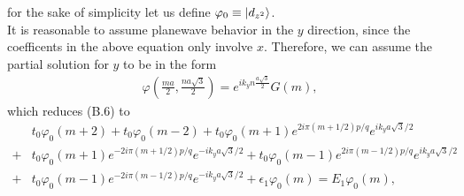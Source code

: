\documentclass{report}
\newcommand{\f}[2]{\dfrac{#1}{#2}}
\begin{document}
for the sake of simplicity let us define $\varphi_{0} \equiv \ket{d_{z^{2}}}$.\\
It is reasonable to assume planewave behavior in the $y$ direction, since the coefficents in the above equation only involve $x$. Therefore, we can assume the partial solution for $y$ to be in the form
\begin{gather}
	\varphi(\frac{ma}{2},\frac{na\sqrt{3}}{2}) = e^{i k_{y} n \frac{a\sqrt{3}}{2}} G(m),
\end{gather}
which reduces (B.6) to
\begin{equation}
	\begin{aligned}
		  & t_{0} \varphi_{0}(m + 2) + t_{0} \varphi_{0}(m - 2) + t_{0} \varphi_{0}(m + 1) e^{2 i \pi (m + 1 /2) p/ q} e^{i k_{y} a\sqrt{3} / 2}                              \\
		+ & t_{0} \varphi_{0}(m + 1) e^{-2 i \pi (m + 1 /2) p/ q} e^{-i k_{y} a\sqrt{3} / 2} + t_{0} \varphi_{0}(m - 1) e^{2 i \pi (m - 1 /2) p/ q} e^{i k_{y} a\sqrt{3} / 2} \\
		+ & t_{0} \varphi_{0}(m - 1) e^{-2 i \pi (m - 1 /2) p/ q} e^{-i k_{y} a\sqrt{3} / 2} + \epsilon_{1} \varphi_{0}(m) = E_{1} \varphi_{0}(m),
	\end{aligned}
\end{equation}
\end{document}
